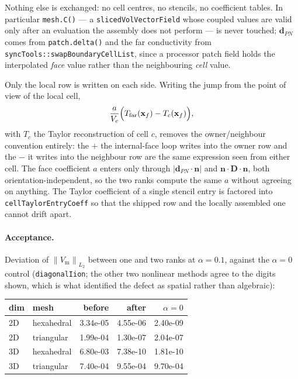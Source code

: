 \documentclass[11pt,a4paper]{article}
\newcommand{\code}[1]{\texttt{\small #1}}
\newcommand{\Vm}{V_{\text{m}}}
\newcommand{\Dten}{\mathbf{D}}
\newcommand{\norm}[1]{\left\lVert #1 \right\rVert}
\begin{document}
Nothing else is exchanged: no cell centres, no stencils, no coefficient tables.
In particular \code{mesh.C()} --- a \code{slicedVolVectorField} whose coupled
values are valid only after an evaluation the assembly does not perform --- is
never touched; $\mathbf{d}_{PN}$ comes from \code{patch.delta()} and the far
conductivity from \code{syncTools::swapBoundaryCellList}, since a processor
patch field holds the interpolated \emph{face} value rather than the
neighbouring \emph{cell} value.

Only the local row is written on each side. Writing the jump from the point of
view of the local cell,
\[
   \frac{a}{V_{c}}\Bigl( T_{\text{far}}(\mathbf{x}_{f})
                        - T_{c}(\mathbf{x}_{f}) \Bigr),
\]
with $T_{c}$ the Taylor reconstruction of cell $c$, removes the owner/neighbour
convention entirely: the $+$ the internal-face loop writes into the owner row
and the $-$ it writes into the neighbour row are the same expression seen from
either cell. The face coefficient $a$ enters only through
$|\mathbf{d}_{PN}\!\cdot\!\mathbf{n}|$ and
$\mathbf{n}\!\cdot\!\Dten\!\cdot\!\mathbf{n}$, both orientation-independent, so
the two ranks compute the same $a$ without agreeing on anything. The Taylor
coefficient of a single stencil entry is factored into
\code{cellTaylorEntryCoeff} so that the shipped row and the locally assembled
one cannot drift apart.

\paragraph{Acceptance.} Deviation of $\norm{\Vm}_{L_2}$ between one and two
ranks at $\alpha=0.1$, against the $\alpha=0$ control (\code{diagonalIion};
the other two nonlinear methods agree to the digits shown, which is what
identified the defect as spatial rather than algebraic):

\begin{center}
\begin{tabular}{@{}llrrr@{}}
\toprule
dim & mesh & before & after & $\alpha=0$ \\
\midrule
2D & hexahedral & 3.34e-05 & 4.55e-06 & 2.40e-09 \\
2D & triangular & 1.99e-04 & 1.30e-07 & 2.04e-07 \\
3D & hexahedral & 6.80e-03 & 7.38e-10 & 1.81e-10 \\
3D & triangular & 7.40e-04 & 9.55e-04 & 9.70e-04 \\
\bottomrule
\end{tabular}
\end{center}
\end{document}
